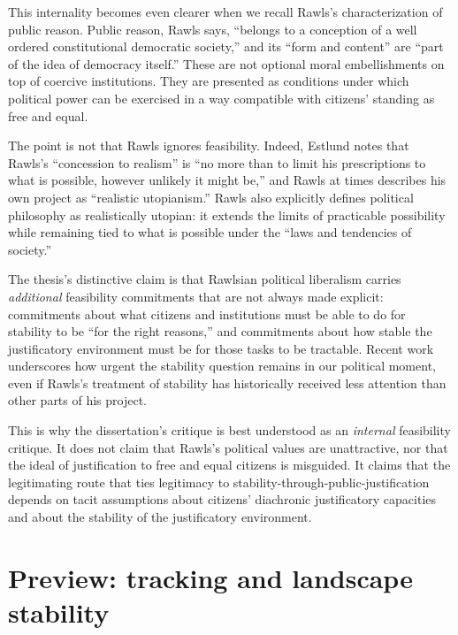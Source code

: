 \documentclass[12pt]{report}
\begin{document}
This internality becomes even clearer when we recall Rawls's characterization of public reason. Public reason, Rawls says, ``belongs to a conception of a well ordered constitutional democratic society,'' and its ``form and content'' are ``part of the idea of democracy itself.''\parencite[p.~765]{rawls1997public} These are not optional moral embellishments on top of coercive institutions. They are presented as conditions under which political power can be exercised in a way compatible with citizens' standing as free and equal.

The point is not that Rawls ignores feasibility. Indeed, Estlund notes that Rawls's ``concession to realism'' is ``no more than to limit his prescriptions to what is possible, however unlikely it might be,'' and Rawls at times describes his own project as ``realistic utopianism.''\parencite[p.~6]{estlund2019utopophobia} Rawls also explicitly defines political philosophy as realistically utopian: it extends the limits of practicable possibility while remaining tied to what is possible under the ``laws and tendencies of society.''\parencite[p.~11]{rawls1999peoples}

The thesis's distinctive claim is that Rawlsian political liberalism carries \emph{additional} feasibility commitments that are not always made explicit: commitments about what citizens and institutions must be able to do for stability to be ``for the right reasons,'' and commitments about how stable the justificatory environment must be for those tasks to be tractable. Recent work underscores how urgent the stability question remains in our political moment, even if Rawls's treatment of stability has historically received less attention than other parts of his project.\parencite[p.~1187]{Weithman2024Rescuing}

This is why the dissertation's critique is best understood as an \emph{internal} feasibility critique. It does not claim that Rawls's political values are unattractive, nor that the ideal of justification to free and equal citizens is misguided. It claims that the legitimating route that ties legitimacy to stability-through-public-justification depends on tacit assumptions about citizens' diachronic justificatory capacities and about the stability of the justificatory environment.

\section{Preview: tracking and landscape stability}\label{sec:preview}
\end{document}
